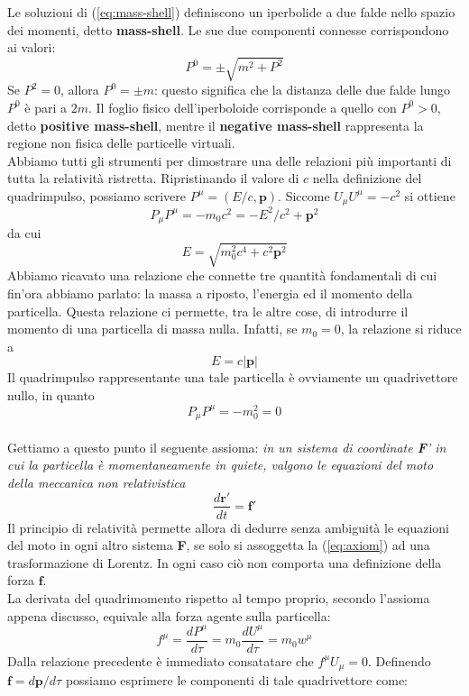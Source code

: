 \documentclass[a4paper,11pt]{book}
\theoremstyle{plain}
\theoremstyle{definition}
\begin{document}
Le soluzioni di (\ref{eq:mass-shell}) definiscono un iperbolide a due falde nello spazio dei momenti, detto \textbf{mass-shell}. Le sue due componenti connesse corrispondono ai valori:
\[
P^0=\pm\sqrt{m^2+P^2}
\]
Se $P^2=0$, allora $P^0=\pm m$: questo significa che la distanza delle due falde lungo $P^0$ è pari a $2m$. Il foglio fisico dell'iperboloide corrisponde a quello con $P^0>0$, detto \textbf{positive mass-shell}, mentre il \textbf{negative mass-shell} rappresenta la regione non fisica delle particelle virtuali. \\
Abbiamo tutti gli strumenti per dimostrare una delle relazioni più importanti di tutta la relatività ristretta. Ripristinando il valore di $c$ nella definizione del quadrimpulso, possiamo scrivere $P^{\mu}=(E/c,\textbf{p})$. Siccome $U_{\mu}U^{\mu}=-c^2$ si ottiene
\[
P_{\mu}P^{\mu}=-m_0c^2=-E^2/c^2+\textbf{p}^2
\]
da cui
\begin{equation}
E=\sqrt{m_0^2c^4+c^2\textbf{p}^2}
\end{equation}
Abbiamo ricavato una relazione che connette tre quantità fondamentali di cui fin'ora abbiamo parlato: la massa a riposto, l'energia ed il momento della particella. Questa relazione ci permette, tra le altre cose, di introdurre il momento di una particella di massa nulla. Infatti, se $m_0=0$, la relazione si riduce a 
\[
E=c|\textbf{p}|
\]
Il quadrimpulso rappresentante una tale particella è ovviamente un quadrivettore nullo, in quanto
\[
P_{\mu}P^{\mu} = -m_0^2=0
\]
\\
Gettiamo a questo punto il seguente assioma: \emph{in un sistema di coordinate \textbf{F}' in cui la particella è momentaneamente in quiete, valgono le equazioni del moto della meccanica non relativistica}
\begin{equation}\label{eq:axiom}
\frac{d\textbf{r}'}{dt}=\textbf{f}'
\end{equation}
Il principio di relatività permette allora di dedurre senza ambiguità le equazioni del moto in ogni altro sistema \textbf{F}, se solo si assoggetta la (\ref{eq:axiom}) ad una trasformazione di Lorentz. In ogni caso ciò non comporta una definizione della forza $\textbf{f}$. \\
La derivata del quadrimomento rispetto al tempo proprio, secondo l'assioma appena discusso, equivale alla forza agente sulla particella:
\begin{equation}\label{eq:motion}
f^{\mu} = \frac{dP^{\mu}}{d\tau}=m_0\frac{dU^{\mu}}{d\tau}=m_0w^{\mu}
\end{equation}
Dalla relazione precedente è immediato consatatare che $f^{\mu}U_{\mu}=0$. Definendo $\textbf{f}=d\textbf{p}/d\tau$ possiamo esprimere le componenti di tale quadrivettore come:
\end{document}
